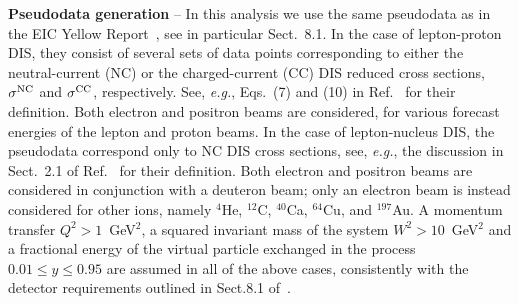 \documentclass[11pt,a4paper]{article}
\newcommand{\myparagraph}[1]{\vspace{0.2cm} \noindent \textbf{#1} --}
\begin{document}
\myparagraph{Pseudodata generation}
In this analysis we use the same pseudodata as in the EIC Yellow
Report~\cite{AbdulKhalek:2021gbh}, see in particular Sect.~8.1. In the case of lepton-proton
DIS, they consist of several sets of data points corresponding to either the
neutral-current (NC) or the charged-current (CC) DIS reduced cross sections,
$\sigma^{\rm NC}$ and $\sigma^{\rm CC}$, respectively. See, {\it e.g.}, Eqs.~(7)
and (10) in Ref.~\cite{Ball:2008by} for their definition.
Both electron and positron beams are considered, for various forecast energies
of the lepton and proton beams. In the case of lepton-nucleus DIS, the
pseudodata correspond only to NC DIS cross sections, see, {\it e.g.}, the
discussion in Sect.~2.1 of Ref.~\cite{AbdulKhalek:2019mzd} for their definition.
Both electron and positron beams are considered in conjunction with a deuteron
beam; only an electron beam is instead considered for other ions, namely
$^4$He, $^{12}$C, $^{40}$Ca, $^{64}$Cu, and $^{197}$Au.
A momentum transfer $Q^2>1$~GeV$^2$, a squared invariant mass of the system
$W^2>10$~GeV$^2$ and a fractional energy of the virtual particle exchanged in
the process $0.01\leq y \leq 0.95$ are assumed in all of the above cases,
consistently with the detector requirements outlined in Sect.8.1
of~\cite{AbdulKhalek:2021gbh}.
\end{document}
